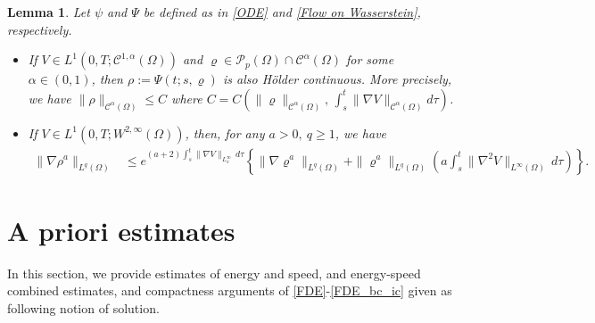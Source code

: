 \documentclass{amsart}
\newtheorem{lemma}[defn]{Lemma}
\numberwithin{equation}{section}
\newcommand{\calC}{{ \mathcal C  }}
\begin{document}
\begin{lemma}\label{Lemma : Holder regularity on the flow}\cite[Lemma~3.19]{HKK01}
Let $\psi$ and $\Psi$ be defined as in \eqref{ODE} and \eqref{Flow on Wasserstein}, respectively. 
\begin{itemize}
\item[(i)] If $V \in L^1(0,T;  \calC^{1, \alpha}(\Omega)) $ and $\varrho\in
\mathcal{P}_p(\Omega) \cap \calC^\alpha (\Omega)$ for some $\alpha \in (0,1)$,
then $\rho:=\Psi(t;s,\varrho)$ is also H\"{o}lder continuous. More
precisely, we have $\| \rho\|_{\calC^\alpha (\Omega)} \leq C $ where $C=C(\| \varrho\|_{\calC^\alpha (\Omega)},\, \int_s^t \|\nabla V \|_{\calC^\alpha (\Omega)} d\tau )$.
\item[(ii)] If $V \in L^1(0,T;  W^{2, \infty}(\Omega)) $, then, for any  $a>0,~ q\geq 1$, we have
\begin{equation*}\label{eq5 : Sobolev}
\begin{aligned}
 \|\nabla \rho^a\|_{L^q (\Omega)}&\leq e^{(a+2)\int_s^t \|\nabla V\|_{L^\infty_x}\, d\tau}\left \{ \|\nabla \varrho^a\|_{L^q (\Omega)} + \| \varrho^{a}\|_{L^q (\Omega)}
  \left ( a\int_s^t \| \nabla^2 V\|_{L^\infty(\Omega)} \,d\tau\right ) \right \}.
\end{aligned}
\end{equation*}
\end{itemize}
\end{lemma}


\section{A priori estimates}\label{SS:priori}

In this section, we provide estimates of energy and speed, and energy-speed combined estimates, and compactness arguments of \eqref{FDE}-\eqref{FDE_bc_ic} given as following notion of solution.
\end{document}

